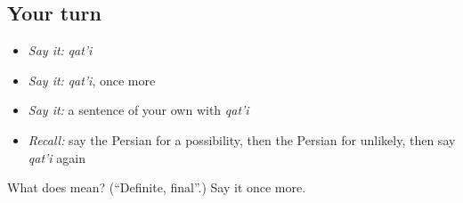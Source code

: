 \subsection*{Your turn}
\begin{itemize}
\raggedright
  \item \emph{Say it:} \emph{qat'i}
  \item \emph{Say it:} \emph{qat'i}, once more
  \item \emph{Say it:} a sentence of your own with \emph{qat'i}
  \item \emph{Recall:} say the Persian for a possibility, then the Persian for unlikely, then say \emph{qat'i} again
\end{itemize}

\begin{tcolorbox}[breakable,colback=teal!4,colframe=teal!35!black,title={Before you move on}]
What does  mean? (\textquotedblleft{}Definite, final\textquotedblright{}.) Say it once more.
\end{tcolorbox}
